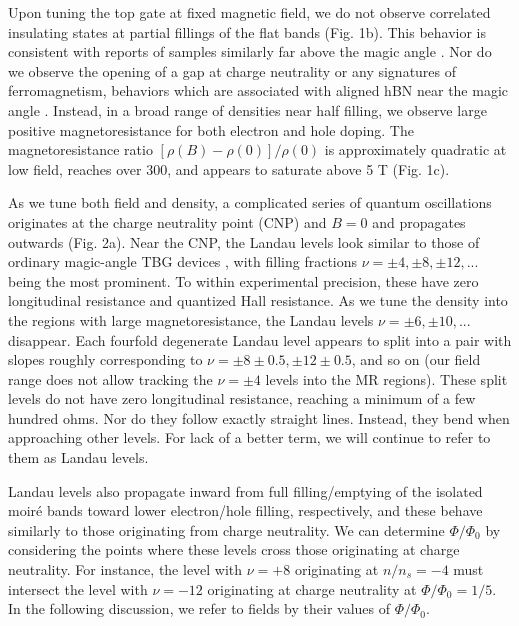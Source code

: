 \documentclass[12pt,twocolumn]{article}
\begin{document}
Upon tuning the top gate at fixed magnetic field, we do not observe correlated insulating states at partial fillings of the flat bands (Fig. 1b). This behavior is consistent with reports of samples similarly far above the magic angle \cite{saitoIndependentSuperconductorsCorrelated2020}. Nor do we observe the opening of a gap at charge neutrality or any signatures of ferromagnetism, behaviors which are associated with aligned hBN near the magic angle \cite{serlinIntrinsicQuantizedAnomalous2019,sharpeEmergentFerromagnetismThreequarters2019,stepanovCompetingZerofieldChern}. Instead, in a broad range of densities near half filling, we observe large positive magnetoresistance for both electron and hole doping. The magnetoresistance ratio $[\rho(B)-\rho(0)]/\rho(0)$ is approximately quadratic at low field, reaches over 300, and appears to saturate above 5 T (Fig. 1c).

As we tune both field and density, a complicated series of quantum oscillations originates at the charge neutrality point (CNP) and $B = 0$ and propagates outwards (Fig. 2a). Near the CNP, the Landau levels look similar to those of ordinary magic-angle TBG devices \cite{caoUnconventionalSuperconductivityMagicangle2018,saitoIndependentSuperconductorsCorrelated2020,yankowitzTuningSuperconductivityTwisted2019}, with filling fractions $\nu = \pm 4, \pm 8, \pm 12, ...$ being the most prominent. To within experimental precision, these have zero longitudinal resistance and quantized Hall resistance. As we tune the density into the regions with large magnetoresistance, the Landau levels $\nu = \pm 6, \pm 10, ...$ disappear. Each fourfold degenerate Landau level appears to split into a pair with slopes roughly corresponding to $\nu = \pm 8\pm 0.5, \pm 12\pm 0.5$, and so on (our field range does not allow tracking the $\nu = \pm 4$ levels into the MR regions). These split levels do not have zero longitudinal resistance, reaching a minimum of a few hundred ohms. Nor do they follow exactly straight lines. Instead, they bend when approaching other levels. For lack of a better term, we will continue to refer to them as Landau levels.

Landau levels also propagate inward from full filling/emptying of the isolated moiré bands toward lower electron/hole filling, respectively, and these behave similarly to those originating from charge neutrality. We can determine $\Phi/\Phi_0$ by considering the points where these levels cross those originating at charge neutrality. For instance, the level with $\nu = +8$ originating at $n/n_s = -4$ must intersect the level with $\nu = -12$ originating at charge neutrality at $\Phi/\Phi_0=1/5$. In the following discussion, we refer to fields by their values of $\Phi/\Phi_0$.
\end{document}
